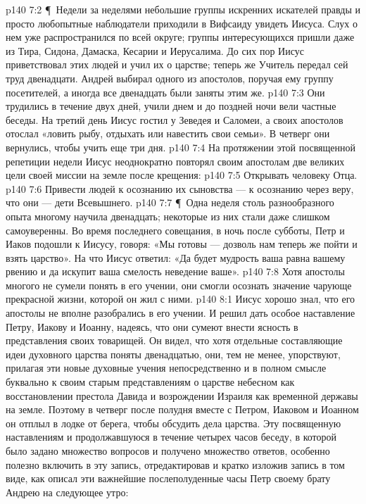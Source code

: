 \vs p140 7:2 \P\ Недели за неделями небольшие группы искренних искателей правды и просто любопытные наблюдатели приходили в Вифсаиду увидеть Иисуса. Слух о нем уже распространился по всей округе; группы интересующихся пришли даже из Тира, Сидона, Дамаска, Кесарии и Иерусалима. До сих пор Иисус приветствовал этих людей и учил их о царстве; теперь же Учитель передал сей труд двенадцати. Андрей выбирал одного из апостолов, поручая ему группу посетителей, а иногда все двенадцать были заняты этим же.
\vs p140 7:3 Они трудились в течение двух дней, учили днем и до поздней ночи вели частные беседы. На третий день Иисус гостил у Зеведея и Саломеи, а своих апостолов отослал «ловить рыбу, отдыхать или навестить свои семьи». В четверг они вернулись, чтобы учить еще три дня.
\vs p140 7:4 На протяжении этой посвященной репетиции недели Иисус неоднократно повторял своим апостолам две великих цели своей миссии на земле после крещения:
\vs p140 7:5 \bibnobreakspace Открывать человеку Отца.
\vs p140 7:6 \bibnobreakspace Привести людей к осознанию их сыновства --- к осознанию через веру, что они --- дети Всевышнего.
\vs p140 7:7 \P\ Одна неделя столь разнообразного опыта многому научила двенадцать; некоторые из них стали даже слишком самоуверенны. Во время последнего совещания, в ночь после субботы, Петр и Иаков подошли к Иисусу, говоря: «Мы готовы --- дозволь нам теперь же пойти и взять царство». На что Иисус ответил: «Да будет мудрость ваша равна вашему рвению и да искупит ваша смелость неведение ваше».
\vs p140 7:8 Хотя апостолы многого не сумели понять в его учении, они смогли осознать значение чарующе прекрасной жизни, которой он жил с ними.
\vs p140 8:1 Иисус хорошо знал, что его апостолы не вполне разобрались в его учении. И решил дать особое наставление Петру, Иакову и Иоанну, надеясь, что они сумеют внести ясность в представления своих товарищей. Он видел, что хотя отдельные составляющие идеи духовного царства поняты двенадцатью, они, тем не менее, упорствуют, прилагая эти новые духовные учения непосредственно и в полном смысле буквально к своим старым представлениям о царстве небесном как восстановлении престола Давида и возрождении Израиля как временной державы на земле. Поэтому в четверг после полудня вместе с Петром, Иаковом и Иоанном он отплыл в лодке от берега, чтобы обсудить дела царства. Эту посвященную наставлениям и продолжавшуюся в течение четырех часов беседу, в которой было задано множество вопросов и получено множество ответов, особенно полезно включить в эту запись, отредактировав и кратко изложив запись в том виде, как описал эти важнейшие послеполуденные часы Петр своему брату Андрею на следующее утро:
